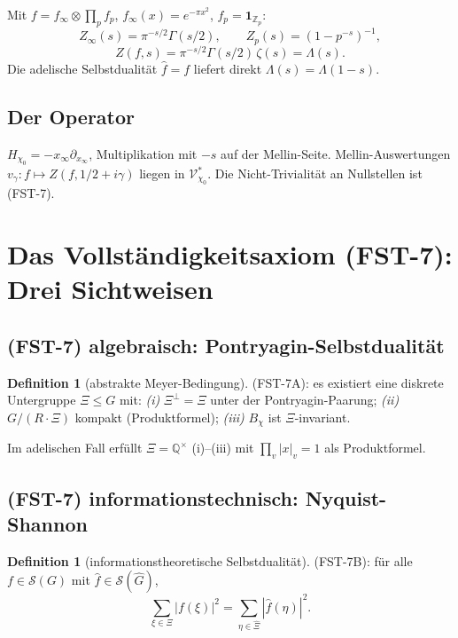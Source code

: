 \documentclass[11pt,a4paper]{article}
\theoremstyle{plain}
\theoremstyle{definition}
\newtheorem{definition}[theorem]{Definition}
\newcommand{\Q}{\mathbb{Q}}
\newcommand{\Z}{\mathbb{Z}}
\newcommand{\V}{\mathcal{V}}
\renewcommand{\S}{\mathcal{S}}
\newcommand{\chifn}{\chi}
\begin{document}
Mit $f = f_\infty \otimes \prod_p f_p$, $f_\infty(x) = e^{-\pi x^2}$,
$f_p = \mathbf{1}_{\Z_p}$:
\[
  Z_\infty(s) = \pi^{-s/2} \Gamma(s/2), \qquad
  Z_p(s) = (1 - p^{-s})^{-1},
\]
\[
  Z(f, s) = \pi^{-s/2} \Gamma(s/2) \, \zeta(s) = \Lambda(s).
\]
Die adelische Selbstdualität $\hat f = f$ liefert direkt
$\Lambda(s) = \Lambda(1-s)$.

\subsection{Der Operator}

$H_{\chifn_0} = -x_\infty \partial_{x_\infty}$, Multiplikation mit
$-s$ auf der Mellin-Seite. Mellin-Auswertungen $v_\gamma: f \mapsto
Z(f, 1/2+i\gamma)$ liegen in $\V_{\chifn_0}^\ast$. Die Nicht-Trivialität
an Nullstellen ist (FST-7).
\section{Das Vollständigkeitsaxiom (FST-7): Drei Sichtweisen}
\label{sec:fst7}

\subsection{(FST-7) algebraisch: Pontryagin-Selbstdualität}

\begin{definition}[abstrakte Meyer-Bedingung]
\label{def:fst7-a}
(FST-7A): es existiert eine diskrete Untergruppe $\Xi \leq G$ mit:
\textit{(i)} $\Xi^\perp = \Xi$ unter der Pontryagin-Paarung;
\textit{(ii)} $G / (R \cdot \Xi)$ kompakt (Produktformel);
\textit{(iii)} $B_\chifn$ ist $\Xi$-invariant.
\end{definition}

Im adelischen Fall erfüllt $\Xi = \Q^\times$ (i)--(iii) mit
$\prod_v |x|_v = 1$ als Produktformel.

\subsection{(FST-7) informationstechnisch: Nyquist-Shannon}

\begin{definition}[informationstheoretische Selbstdualität]
\label{def:fst7-b}
(FST-7B): für alle $f \in \S(G)$ mit $\hat f \in \S(\hat G)$,
\[
  \sum_{\xi \in \Xi} |f(\xi)|^2 = \sum_{\eta \in \hat\Xi}
    |\hat f(\eta)|^2.
\]
\end{definition}
\end{document}

